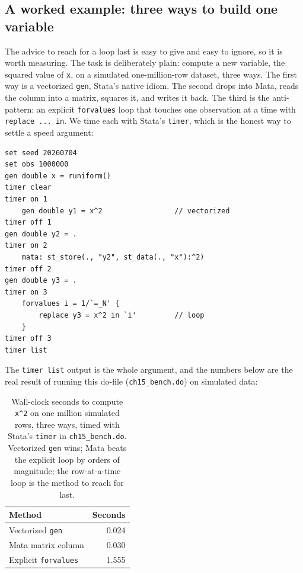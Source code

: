 \documentclass[
    a4paper,
    fontsize=10pt,
    twoside=true,
    numbers=noenddot,
]{kaobook}
\begin{document}
\subsection{A worked example: three ways to build one variable}\label{sec:bench}
The advice to reach for a loop last is easy to give and easy to ignore, so it is worth measuring. The task is deliberately plain: compute a new variable, the squared value of \texttt{x}, on a simulated one-million-row dataset, three ways. The first way is a vectorized \texttt{gen}, Stata's native idiom. The second drops into Mata, reads the column into a matrix, squares it, and writes it back. The third is the anti-pattern: an explicit \texttt{forvalues} loop that touches one observation at a time with \texttt{replace ... in}. We time each with Stata's \texttt{timer}, which is the honest way to settle a speed argument:
{\footnotesize
\begin{verbatim}
set seed 20260704
set obs 1000000
gen double x = runiform()
timer clear
timer on 1
    gen double y1 = x^2                 // vectorized
timer off 1
gen double y2 = .
timer on 2
    mata: st_store(., "y2", st_data(., "x"):^2)
timer off 2
gen double y3 = .
timer on 3
    forvalues i = 1/`=_N' {
        replace y3 = x^2 in `i'         // loop
    }
timer off 3
timer list
\end{verbatim}
}
The \texttt{timer list} output is the whole argument, and the numbers below are the real result of running this do-file (\texttt{ch15\_bench.do}) on simulated data:

\begin{table}[htbp]
\centering
\caption[Three ways to build one variable, one million rows]{Wall-clock seconds to compute \texttt{x\textasciicircum 2} on one million simulated rows, three ways, timed with Stata's \texttt{timer} in \texttt{ch15\_bench.do}. Vectorized \texttt{gen} wins; Mata beats the explicit loop by orders of magnitude; the row-at-a-time loop is the method to reach for last.}
\label{tab:bench}
\begin{tabular}{lr}
\hline
Method                       & Seconds \\
\hline
Vectorized \texttt{gen}      & 0.024 \\
Mata matrix column           & 0.030 \\
Explicit \texttt{forvalues}  & 1.555 \\
\hline
\end{tabular}
\end{table}
\end{document}
